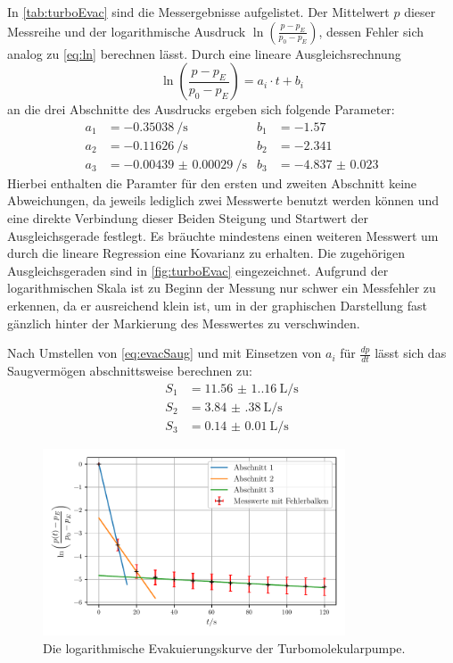     In \autoref{tab:turboEvac} sind die Messergebnisse aufgelistet. Der Mittelwert $p$ dieser Messreihe und der logarithmische Ausdruck
    $\ln\left(\frac{p-p_E}{p_0-p_E}\right)$, dessen Fehler sich analog zu \autoref{eq:ln} berechnen lässt.
    Durch eine lineare Ausgleichsrechnung 
    \begin{equation*}
        \ln\left(\frac{p-p_E}{p_0-p_E}\right) = a_i \cdot t + b_i
    \end{equation*}
    an die drei Abschnitte des Ausdrucks ergeben sich folgende Parameter:
    \begin{align*}
        a_1 &= \qty{-0.35038}{\per\second} & b_1 &= \num{-1.57} \\
        a_2 &= \qty{-0.11626}{\per\second} & b_2 &= \num{-2.341} \\
        a_3 &= \qty{-0.00439(29)}{\per\second} & b_3 &= \num{-4.837(23)}
    \end{align*}
    Hierbei enthalten die Paramter für den ersten und zweiten Abschnitt keine Abweichungen, da jeweils lediglich zwei Messwerte benutzt werden können und eine direkte
    Verbindung dieser Beiden Steigung und Startwert der Ausgleichsgerade festlegt. Es bräuchte mindestens einen weiteren Messwert um durch die lineare Regression eine Kovarianz zu erhalten.
    Die zugehörigen Ausgleichsgeraden sind in \autoref{fig:turboEvac} eingezeichnet. Aufgrund der logarithmischen Skala ist zu Beginn der Messung nur schwer ein Messfehler zu erkennen,
    da er ausreichend klein ist, um in der graphischen Darstellung fast gänzlich hinter der Markierung des Messwertes zu verschwinden.

    Nach Umstellen von \autoref{eq:evacSaug} und mit Einsetzen von $a_i$ für $\frac{dp}{dt}$
    lässt sich das Saugvermögen abschnittsweise berechnen zu:
    \begin{align*}
        S_1 &= \qty{11.56(1.16)}{\liter\per\second} \\
        S_2 &= \qty{3.84(38)}{\liter\per\second} \\
        S_3 &= \qty{0.14(1)}{\liter\per\second} 
    \end{align*}

    \begin{figure}
        \centering
        \includegraphics[width=0.8\textwidth]{abb/turbo_evac.pdf}
        \caption{Die logarithmische Evakuierungskurve der Turbomolekularpumpe.}
        \label{fig:turboEvac}
    \end{figure}

